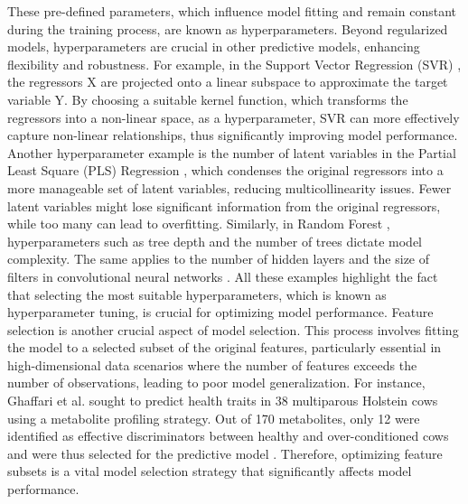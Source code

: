 These pre-defined parameters, which influence model fitting and remain constant during the training process, are known as hyperparameters. Beyond regularized models, hyperparameters are crucial in other predictive models, enhancing flexibility and robustness. For example, in the Support Vector Regression (SVR) \citep{drucker_support_1996}, the regressors X are projected onto a linear subspace to approximate the target variable Y. By choosing a suitable kernel function, which transforms the regressors into a non-linear space, as a hyperparameter, SVR can more effectively capture non-linear relationships, thus significantly improving model performance. Another hyperparameter example is the number of latent variables in the Partial Least Square (PLS) Regression \citep{abdi_partial_2003}, which condenses the original regressors into a more manageable set of latent variables, reducing multicollinearity issues. Fewer latent variables might lose significant information from the original regressors, while too many can lead to overfitting. Similarly, in Random Forest \citep{breiman_random_2001}, hyperparameters such as tree depth and the number of trees dictate model complexity. The same applies to the number of hidden layers and the size of filters in convolutional neural networks \citep{lecun_generalization_1989}. All these examples highlight the fact that selecting the most suitable hyperparameters, which is known as hyperparameter tuning, is crucial for optimizing model performance.
Feature selection is another crucial aspect of model selection. This process involves fitting the model to a selected subset of the original features, particularly essential in high-dimensional data scenarios where the number of features exceeds the number of observations, leading to poor model generalization. For instance, Ghaffari et al. sought to predict health traits in 38 multiparous Holstein cows using a metabolite profiling strategy. Out of 170 metabolites, only 12 were identified as effective discriminators between healthy and over-conditioned cows and were thus selected for the predictive model \citep{ghaffari_metabolomics_2019}. Therefore, optimizing feature subsets is a vital model selection strategy that significantly affects model performance.
